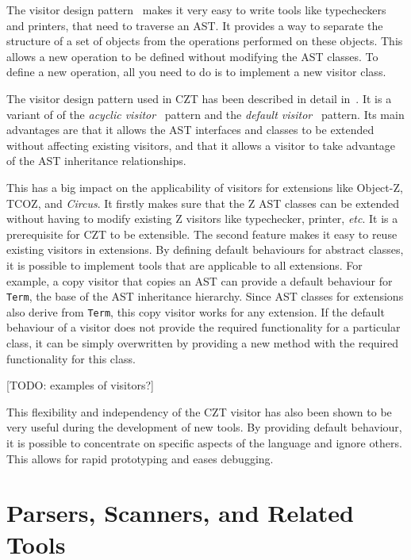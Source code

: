 \documentclass{llncs}
\newcommand{\Circus}{{\sf\slshape Circus}}
\newcommand{\Interface}[1]{\texttt{#1}}
\begin{document}
  The visitor design pattern~\cite{GamEA:95,MaiCha:01} makes it very
  easy to write tools like typecheckers and printers, that need to
  traverse an AST.  It provides a way to separate the structure of a
  set of objects from the operations performed on these objects.  This
  allows a new operation to be defined without modifying the AST
  classes.  To define a new operation, all you need to do is to
  implement a new visitor class.

  The visitor design pattern used in CZT has been described in detail
  in~\cite{czt}.  It is a variant of of the \emph{acyclic
  visitor}~\cite{Mar:97} pattern and the \emph{default
  visitor}~\cite{Nor:97} pattern.  Its main advantages are that it
  allows the AST interfaces and classes to be extended without
  affecting existing visitors, and that it allows a visitor to take
  advantage of the AST inheritance relationships.

  This has a big impact on the applicability of visitors for
  extensions like Object-Z, TCOZ, and \Circus.  It firstly makes sure
  that the Z AST classes can be extended without having to modify
  existing Z visitors like typechecker, printer, \textit{etc}.  It is a
  prerequisite for CZT to be extensible.  The second feature makes it
  easy to reuse existing visitors in extensions.  By defining default
  behaviours for abstract classes, it is possible to implement tools
  that are applicable to all extensions.  For example, a copy visitor
  that copies an AST can provide a default behaviour for
  \Interface{Term}, the base of the AST inheritance hierarchy.  Since
  AST classes for extensions also derive from \Interface{Term}, this
  copy visitor works for any extension.  If the default behaviour of a
  visitor does not provide the required functionality for a particular
  class, it can be simply overwritten by providing a new method with
  the required functionality for this class.

  [TODO: examples of visitors?]

  This flexibility and independency of the CZT visitor has also been
  shown to be very useful during the development of new tools.  By
  providing default behaviour, it is possible to concentrate on
  specific aspects of the language and ignore others.  This allows for
  rapid prototyping and eases debugging.

\section{Parsers, Scanners, and Related Tools}
\label{parsers}
\end{document}
